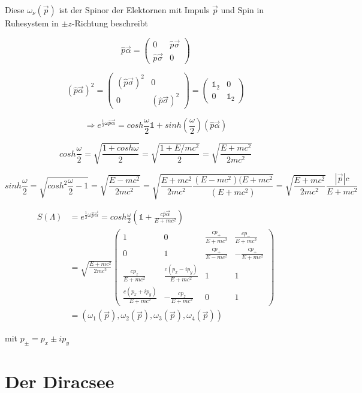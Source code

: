 Diese \(\omega_\nu(\vec p)\) ist der Spinor der Elektornen mit Impuls \(\vec p\) und Spin in Ruhesystem in \(\pm z\)-Richtung beschreibt

\[\hat p\vec \alpha = \begin{pmatrix} 0& \hat p\vec\sigma \\ \hat p\vec \sigma& 0 \end{pmatrix} \]

\[ (\hat p\vec \alpha)^2 = \begin{pmatrix} (\hat p\vec\sigma)^2&0 \\0& (\hat p\vec \sigma)^2 \end{pmatrix} =  \begin{pmatrix} \mathbb 1_2&0 \\0& \mathbb 1_2 \end{pmatrix}  \]

\[\Rightarrow e^{\frac{1}{2}\omega\hat p\vec\alpha} = cosh\frac{\omega}{2}\mathbb 1 + sinh(\frac{\omega}{2})(\hat p\vec \alpha)\]

\[cosh\frac{\omega}{2} = \sqrt{\frac{1+cosh\omega}{2}} = \sqrt{\frac{1+E/mc^2}{2}} =  \sqrt{\frac{E+mc^2}{2mc^2}} \]


\[sinh\frac{\omega}{2} = \sqrt{cosh^2\frac{\omega}{2}-1} =  \sqrt{\frac{E-mc^2}{2mc^2}} =  \sqrt{\frac{E+mc^2}{2mc^2} \frac{(E-mc^2)(E+mc^2}{(E+mc^2)} } = \sqrt{\frac{E+mc^2}{2mc^2}} \frac{|\vec p|c}{E+mc^2}   \]

\begin{align}
S(\Lambda) &= e^{\frac{1}{2}\omega\hat p \vec\alpha} = cosh\frac{\omega}{2}(\mathbb 1 + \frac{c\hat p\vec\alpha}{E+mc^2})\\
&=\sqrt{\frac{E+mc^2}{2mc^2}} \begin{pmatrix}1&0&\frac{cp_+}{E+mc^2}&\frac{cp_-}{E+mc^2}\\0&1&\frac{cp_+}{E-mc^2} &-\frac{cp_+}{E+mc^2}\\\frac{cp_z}{E+mc^2} &\frac{c(p_x-ip_y)}{E+mc^2}&1&1\\\frac{c(p_x+ip_y)}{E+mc^2} &-\frac{cp_z}{E+mc^2} &0&1\end{pmatrix} \\
&= (\omega_1(\vec p),\omega_2(\vec p), \omega_3(\vec p),\omega_4(\vec p))
\end{align}

mit \(p_\pm = p_x\pm ip_y\)


\section{Der Diracsee}




